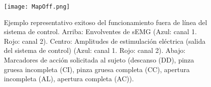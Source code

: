 

\begin{figure}[htbp]
	\centering
	\texttt{[image: MapOff.png]}
	\caption[Ejemplo representativo exitoso del funcionamiento fuera de línea del sistema de control]{Ejemplo representativo exitoso del funcionamiento fuera de línea del sistema de control. Arriba: Envolventes de sEMG (Azul: canal 1. Rojo: canal 2). Centro: Amplitudes de estimulación eléctrica (salida del sistema de control) (Azul: canal 1. Rojo: canal 2). Abajo: Marcadores de acción solicitada al sujeto (descanso (DD), pinza gruesa incompleta (CI), pinza gruesa completa (CC), apertura incompleta (AL), apertura completa (AC)).}
	\label{Figura: MapOff}
\end{figure}


